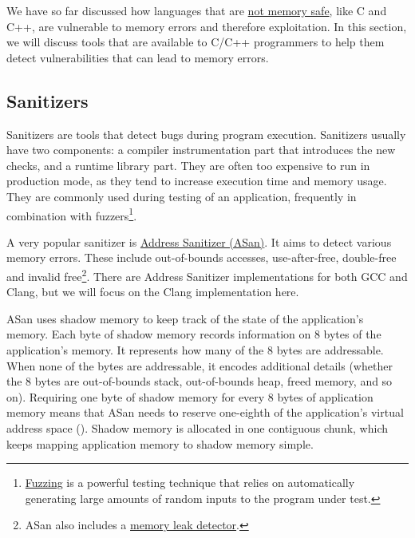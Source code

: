 \documentclass[
  a4paper,
]{report}
\begin{document}
We have so far discussed how languages that are
\hyperref[a-bit-of-background-on-memory-vulnerabilities]{not memory
safe}, like C and C++, are vulnerable to memory errors and therefore
exploitation. In this section, we will discuss tools that are available
to
\label{__index_entry_60}{C}/\label{__index_entry_61}{C++}
programmers to help them detect vulnerabilities that can lead to memory
errors.

\subsection{Sanitizers}\label{sanitizers}

\label{__index_entry_62}{Sanitizers}
are tools that detect bugs during program execution. Sanitizers usually
have two components: a compiler instrumentation part that introduces the
new checks, and a runtime library part. They are often too expensive to
run in production mode, as they tend to increase execution time and
memory usage. They are commonly used during testing of an application,
frequently in combination with
\label{__index_entry_63}{fuzzers}\footnote{\href{https://en.wikipedia.org/wiki/Fuzzing}{\label{__index_entry_64}{Fuzzing}}
  is a powerful testing technique that relies on automatically
  generating large amounts of random inputs to the program under test.}.

A very popular sanitizer is
\href{https://clang.llvm.org/docs/AddressSanitizer.html}{\label{__index_entry_65}{Address
Sanitizer (ASan)}}. It aims to detect
various memory errors. These include out-of-bounds accesses,
use-after-free, double-free and invalid free\footnote{ASan also includes
  a
  \href{https://clang.llvm.org/docs/LeakSanitizer.html}{\label{__index_entry_66}{memory
  leak detector}}.}. There are Address Sanitizer
implementations for both
\label{__index_entry_67}{GCC} and
\label{__index_entry_68}{Clang}, but we will
focus on the Clang implementation here.

ASan uses \label{__index_entry_69}{shadow
memory} to keep track of the state of the
application's memory. Each byte of shadow memory records information on
8 bytes of the application's memory. It represents how many of the 8
bytes are addressable. When none of the bytes are addressable, it
encodes additional details (whether the 8 bytes are out-of-bounds stack,
out-of-bounds heap, freed memory, and so on). Requiring one byte of
shadow memory for every 8 bytes of application memory means that ASan
needs to reserve one-eighth of the application's virtual address space
(). Shadow memory
is allocated in one contiguous chunk, which keeps mapping application
memory to shadow memory simple.
\end{document}
